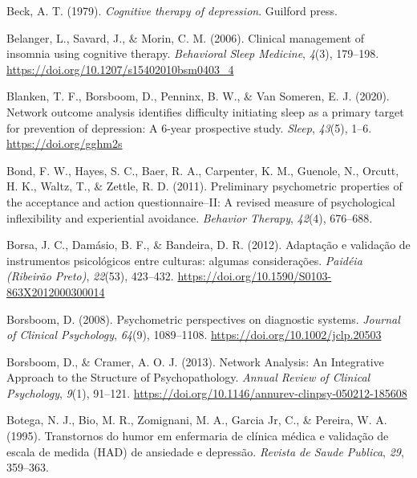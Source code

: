 \documentclass[
  ,doc,11pt, twoside,floatsintext]{apa6}
\newlength{\cslhangindent}
\newlength{\cslentryspacingunit} %
\newenvironment{CSLReferences}[2] %
 {%
  \setlength{\parindent}{0pt}
  \ifodd #1
  \let\oldpar\par
  \def\par{\hangindent=\cslhangindent\oldpar}
  \fi
  \setlength{\parskip}{#2\cslentryspacingunit}
 }%
 {}
\begin{document}
\begin{CSLReferences}{1}{0}
\leavevmode{}%
Beck, A. T. (1979). \emph{Cognitive therapy of depression}. Guilford press.

\leavevmode{}%
Belanger, L., Savard, J., \& Morin, C. M. (2006). Clinical management of insomnia using cognitive therapy. \emph{Behavioral Sleep Medicine}, \emph{4}(3), 179--198. \url{https://doi.org/10.1207/s15402010bsm0403_4}

\leavevmode{}%
Blanken, T. F., Borsboom, D., Penninx, B. W., \& Van Someren, E. J. (2020). Network outcome analysis identifies difficulty initiating sleep as a primary target for prevention of depression: A 6-year prospective study. \emph{Sleep}, \emph{43}(5), 1--6. \url{https://doi.org/gghm2s}

\leavevmode{}%
Bond, F. W., Hayes, S. C., Baer, R. A., Carpenter, K. M., Guenole, N., Orcutt, H. K., Waltz, T., \& Zettle, R. D. (2011). Preliminary psychometric properties of the acceptance and action questionnaire--II: A revised measure of psychological inflexibility and experiential avoidance. \emph{Behavior Therapy}, \emph{42}(4), 676--688.

\leavevmode{}%
Borsa, J. C., Damásio, B. F., \& Bandeira, D. R. (2012). {Adaptação e validação de instrumentos psicológicos entre culturas: algumas considerações}. \emph{Paidéia (Ribeirão Preto)}, \emph{22}(53), 423--432. \url{https://doi.org/10.1590/S0103-863X2012000300014}

\leavevmode{}%
Borsboom, D. (2008). Psychometric perspectives on diagnostic systems. \emph{Journal of Clinical Psychology}, \emph{64}(9), 1089--1108. \url{https://doi.org/10.1002/jclp.20503}

\leavevmode{}%
Borsboom, D., \& Cramer, A. O. J. (2013). Network {Analysis}: {An Integrative Approach} to the {Structure} of {Psychopathology}. \emph{Annual Review of Clinical Psychology}, \emph{9}(1), 91--121. \url{https://doi.org/10.1146/annurev-clinpsy-050212-185608}

\leavevmode{}%
Botega, N. J., Bio, M. R., Zomignani, M. A., Garcia Jr, C., \& Pereira, W. A. (1995). Transtornos do humor em enfermaria de clínica médica e validação de escala de medida (HAD) de ansiedade e depressão. \emph{Revista de Saude Publica}, \emph{29}, 359--363.


\end{CSLReferences}
\end{document}
